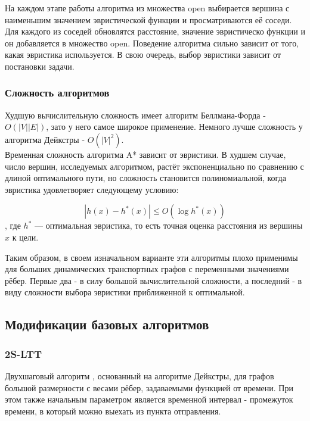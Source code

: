 \documentclass[12pt]{article}
\begin{document}
На каждом этапе работы алгоритма из множества open выбирается вершина с наименьшим значением эвристической функции и просматриваются её соседи. Для каждого из соседей обновлятся расстояние, значение эвристическо функции и он добавляется в множество open. Поведение алгоритма сильно зависит от того, какая эвристика используется. В свою очередь, выбор эвристики зависит от постановки задачи.
 
\subsubsection{Сложность алгоритмов}

Худшую вычислительную сложность имеет алгоритм Беллмана-Форда - $O(|V||E|)$, зато у него самое широкое применение. Немного лучше сложность у алгоритма Дейкстры - $O(|V|^2)$. \\
Временная сложность алгоритма A* зависит от эвристики. В худшем случае, число вершин, исследуемых алгоритмом, растёт экспоненциально по сравнению с длиной оптимального пути, но сложность становится полиномиальной, когда эвристика удовлетворяет следующему условию:

$$|h(x)-h^*(x)| \leq O(\log h^*(x))$$, где $h^*$ — оптимальная эвристика, то есть точная оценка расстояния из вершины $x$ к цели. 

Таким образом, в своем изначальном варианте эти алгоритмы плохо применимы для больших динамических транспортных графов с переменными значениями рёбер. Первые два - в силу большой вычислительной сложности, а последний - в виду сложности выбора эвристики приближенной к оптимальной.

\subsection{Модификации базовых алгоритмов}

\subsubsection{2S-LTT}

Двухшаговый алгоритм \cite{2s-ltt}, основанный на алгоритме Дейкстры, для графов большой размерности с весами рёбер, задаваемыми функцией от времени. При этом также начальным параметром является временной интервал - промежуток времени, в который можно выехать из пункта отправления.
\end{document}
